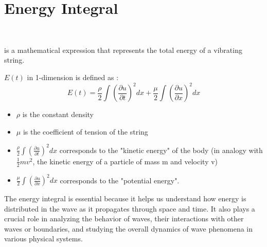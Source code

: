 \documentclass[]{article}
\begin{document}
\section{Energy Integral}
\
\begin{definition} 
    is a mathematical expression that represents the total energy of a vibrating string.
\end{definition}
$E(t)$ in 1-dimension is defined as :
\[
E(t)  =  \frac{\rho}{2} \int {\left(\frac{\partial u}{\partial t}\right)}^2 dx + \frac{\mu}{2} \int {\left(\frac{\partial u}{\partial x}\right)}^2 dx
\] 
\begin{itemize}
    \item $\rho$ is the constant density
    \item $\mu$ is the coefficient of tension of the string
    \item $\displaystyle \frac{\rho}{2} \int {\left(\frac{\partial u}{\partial t}\right)}^2 dx $ corresponds to the "kinetic energy" of the body (in analogy with $\frac{1}{2}mv^2$, the kinetic energy of a particle of mass m and velocity v)
    \item $\displaystyle \frac{\mu}{2} \int {\left(\frac{\partial u}{\partial x}\right)}^2 dx $ corresponds to the "potential energy".
\end{itemize}

The energy integral is essential because it helps us understand how energy is distributed in the wave as it propagates through space and time. It also plays a crucial role in analyzing the behavior of waves, their interactions with other waves or boundaries, and studying the overall dynamics of wave phenomena in various physical systems.
\end{document}
